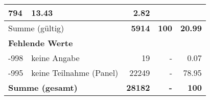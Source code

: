 \begin{longtable}{lXrrr}
       \num{794} &
       \num[round-mode=places,round-precision=2]{13,43} &
         \num[round-mode=places,round-precision=2]{2,82} \\
     \midrule
     \multicolumn{2}{l}{Summe (gültig)} &
       \textbf{\num{5914}} &
     \textbf{100} &
       \textbf{\num[round-mode=places,round-precision=2]{20,99}} \\
     \multicolumn{5}{l}{\textbf{Fehlende Werte}}\\
       -998 &
       keine Angabe &
         \num{19} &
        - &
         \num[round-mode=places,round-precision=2]{0,07} \\
       -995 &
       keine Teilnahme (Panel) &
         \num{22249} &
        - &
         \num[round-mode=places,round-precision=2]{78,95} \\
     \midrule
     \multicolumn{2}{l}{\textbf{Summe (gesamt)}} &
          \textbf{\num{28182}} &
        \textbf{-} &
        \textbf{100} \\
     \bottomrule
     \end{longtable}
     
